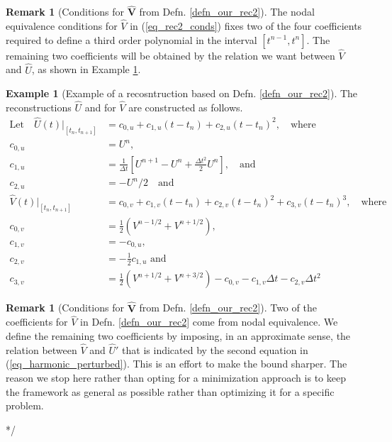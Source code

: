 \documentclass[12pt,a4paper]{article}
\numberwithin{equation}{section}
\theoremstyle{definition}
\newcommand{\qp}[1]{\left(#1\right)}
\newcommand{\qb}[1]{\left[#1\right]}
\newcommand{\rec}[1]{\widehat{{#1}}}
\newtheorem{Rem}[subsection]{Remark}
\newtheorem{Example}[subsection]{Example}
\begin{document}
\begin{Rem}[Conditions for $\hat{\textbf{V}}$ from Defn. \ref{defn_our_rec2}]
	The nodal equivalence conditions for $\rec{V}$ in (\ref{eq_rec2_conds}) fixes two of the four coefficients required to define a third order polynomial in the interval $\qb{t^{n-1}, t^n}$.  The remaining two coefficients will be obtained by the relation we want between $\rec{V}$ and $\rec{U}$, as shown in Example \ref{example:sample_rec}.  
\end{Rem}
\begin{Example}[Example of a recosntruction based on Defn. \ref{defn_our_rec2}]\label{example:sample_rec}
The reconstructions $\rec{U}$  and for $\rec{V}$ are constructed as follows.
\begin{equation}
\begin{aligned}
\text{Let}\quad\hat{U}\qp{t}|_{\qb{{t_n, t_{n+1}}}}&= c_{0,u} +c_{1,u}\qp{t-t_n} +c_{2,u}\qp{t-t_n}^2,\quad\text{where}\\
c_{0,u} &= U^n,\\
c_{1,u} &= \frac{1}{\Delta t}\qb{U^{n+1}-U^n + \frac{\Delta t^2}{2}U^n},\quad\text{and}\\
c_{2,u} &= -U^n/2\quad \text{and}\\
\hat{V}\qp{t}|_{\qb{{t_n, t_{n+1}}}}&= c_{0,v} +c_{1,v}\qp{t-t_n} +c_{2,v}\qp{t-t_n}^2+c_{3,v}\qp{t-t_n}^3,\quad\text{where}\\
c_{0,v} &=\frac{1}{2}\qp{V^{n-1/2}+V^{n+1/2} },\\
c_{1,v} &= -c_{0,u},\\
c_{2,v} &= -\frac{1}{2}c_{1,u}\text{  and}\\
c_{3,v} &= \frac{1}{2}\qp{V^{n+1/2}+V^{n+3/2} }-c_{0,v}- c_{1,v}\Delta t- c_{2,v}\Delta t^2
\end{aligned}
\end{equation}
\end{Example}



\begin{Rem}[Conditions for $\hat{\textbf{V}}$ from Defn. \ref{defn_our_rec2}]
Two of the coefficients for $\rec{V}$ in Defn. \ref{defn_our_rec2} come from nodal equivalence.  We define the remaining two coefficients  by imposing, in an approximate sense, the relation between $\rec{V}$ and $\rec{U}'$ that is indicated by the second equation in (\ref{eq_harmonic_perturbed}).  This is an effort to make the bound sharper. The reason we stop here rather than opting for a minimization approach is to keep the framework as general as possible rather than optimizing it for a specific problem.
\end{Rem}
*/
\end{document}
